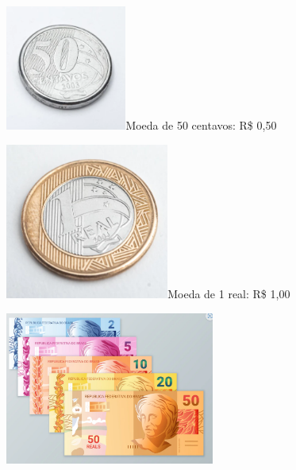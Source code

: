 {%

\includegraphics[width=1.56667in,height=1.61849in]{./media/image67.png}Moeda
de 50 centavos: R\$ 0,50


\includegraphics[width=2.11667in,height=2.01180in]{./media/image68.png}Moeda
de 1 real: R\$ 1,00


\includegraphics[width=2.71068in,height=1.97500in]{./media/image69.png}%

}
